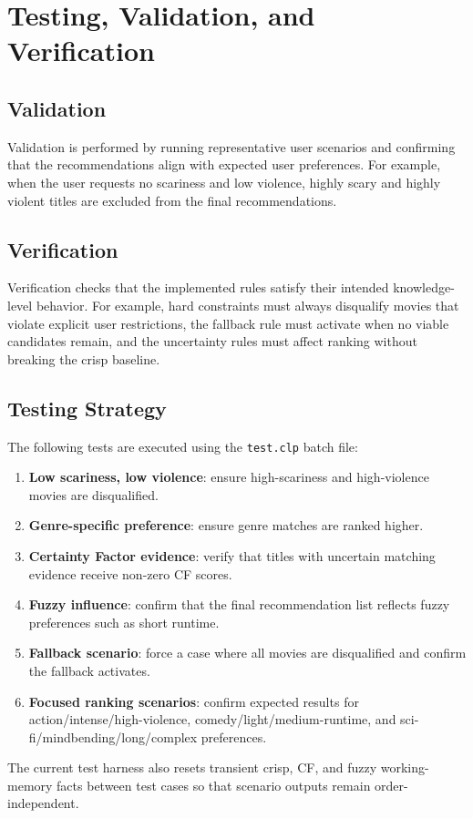 \documentclass[11pt]{article}
\begin{document}
\section{Testing, Validation, and Verification}

\subsection{Validation}
Validation is performed by running representative user scenarios and confirming that the recommendations align with expected user preferences. For example, when the user requests no scariness and low violence, highly scary and highly violent titles are excluded from the final recommendations.

\subsection{Verification}
Verification checks that the implemented rules satisfy their intended knowledge-level behavior. For example, hard constraints must always disqualify movies that violate explicit user restrictions, the fallback rule must activate when no viable candidates remain, and the uncertainty rules must affect ranking without breaking the crisp baseline.

\subsection{Testing Strategy}
The following tests are executed using the \texttt{test.clp} batch file:
\begin{enumerate}
  \item \textbf{Low scariness, low violence}: ensure high-scariness and high-violence movies are disqualified.
  \item \textbf{Genre-specific preference}: ensure genre matches are ranked higher.
  \item \textbf{Certainty Factor evidence}: verify that titles with uncertain matching evidence receive non-zero CF scores.
  \item \textbf{Fuzzy influence}: confirm that the final recommendation list reflects fuzzy preferences such as short runtime.
  \item \textbf{Fallback scenario}: force a case where all movies are disqualified and confirm the fallback activates.
  \item \textbf{Focused ranking scenarios}: confirm expected results for action/intense/high-violence, comedy/light/medium-runtime, and sci-fi/mindbending/long/complex preferences.
\end{enumerate}
The current test harness also resets transient crisp, CF, and fuzzy working-memory facts between test cases so that scenario outputs remain order-independent.
\end{document}
